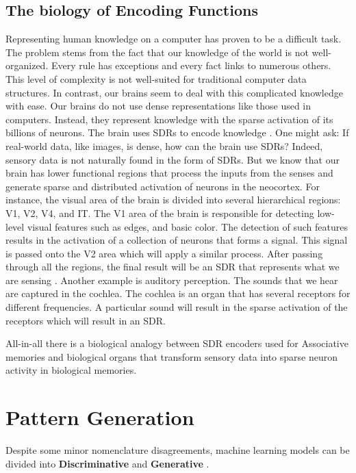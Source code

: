 \documentclass{article}
\begin{document}
\subsection{The biology of Encoding Functions}
Representing human knowledge on a computer has proven to be a difficult task. The problem stems from the fact that our knowledge of the world is not well-organized. Every rule has exceptions and every fact links to numerous others. This level of complexity is not well-suited for traditional computer data structures. In contrast, our brains seem to deal with this complicated knowledge with ease. Our brains do not use dense representations like those used in computers. Instead, they represent knowledge with the sparse activation of its billions of neurons. The brain uses SDRs to encode knowledge \cite{Hawkins-et-al-2016-Book}. One might ask: If real-world data, like images, is dense, how can the brain use SDRs? Indeed, sensory data is not naturally found in the form of SDRs. But we know that our brain has lower functional regions that process the inputs from the senses and generate sparse and distributed activation of neurons in the neocortex. For instance, the visual area of the brain is divided into several hierarchical regions: V1, V2, V4, and IT. The V1 area of the brain is responsible for detecting low-level visual features such as edges, and basic color. The detection of such features results in the activation of a collection of neurons that forms a signal. This signal is passed onto the V2 area which will apply a similar process. After passing through all the regions, the final result will be an SDR that represents what we are sensing \cite{hawkins2004intelligence}. Another example is auditory perception. The sounds that we hear are captured in the cochlea. The cochlea is an organ that has several receptors for different frequencies. A particular sound will result in the sparse activation of the receptors which will result in an SDR.

All-in-all there is a biological analogy between SDR encoders used for Associative memories and biological organs that transform sensory data into sparse neuron activity in biological memories.

\section{Pattern Generation}
Despite some minor nomenclature disagreements, machine learning models can be divided into \textbf{Discriminative} and \textbf{Generative} \cite{ng2002discriminative, kingma2019introduction}. 
\end{document}
